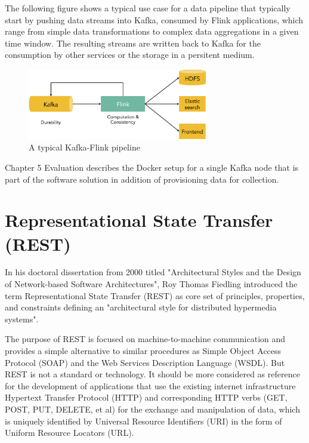 The following figure shows a typical use case for a data pipeline that typically start by pushing data
streams into Kafka, consumed by Flink applications, which range from simple data transformations
to complex data aggregations in a given time window. The resulting streams are written back to Kafka
for the consumption by other services or the storage in a persitent medium.
\begin{figure}[H]
	\centering
	\includegraphics[width=0.7\textwidth]{../images/05-kafka-flink-pipeline.png}
	\caption{A typical Kafka-Flink pipeline{\cite{Dartisans15}}}
	\label{kafka-flink-pipeline}
\end{figure}

Chapter 5 Evaluation describes the Docker setup for a single Kafka node that is part of the
software solution in addition of provisioning data for collection.

\section{Representational State Transfer (REST)}
In his doctoral dissertation from 2000 titled "Architectural Styles and the Design of
Network-based Software Architectures", Roy Thomas Fiedling introduced the term
Representational State Transfer (REST) as core set of principles, properties, and
constraints defining an "architectural style for distributed hypermedia systems"\cite{Field00}.

The purpose of REST is focused on machine-to-machine communication and provides a simple alternative to similar procedures
as Simple Object Access Protocol (SOAP) and the Web Services Description Language (WSDL). But REST is not a standard or
technology. It should be more considered as reference for the development of applications that use the existing internet
infrastructure Hypertext Transfer Protocol (HTTP) and corresponding HTTP verbs (GET, POST, PUT, DELETE, et al) for the
exchange and manipulation of data, which is uniquely identified by Universal Resource Identifiers (URI) in the form of
Uniform Resource Locators (URL).

